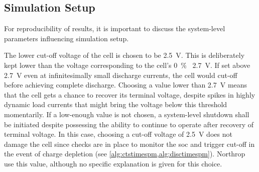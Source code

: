 \subsection{Simulation Setup}\label{subsec:basicspmsimsetup}

For  reproducibility of  results, it  is important  to discuss  the system-level
parameters influencing simulation setup.

The lower  cut-off voltage  of the  cell is chosen  to be  \SI{2.5}{\volt}. This
is  deliberately  kept  lower  than  the voltage  corresponding  to  the  cell's
\SI{0}{\percent} \ie~\SI{2.7}{\volt}.  If set  above  \SI{2.7}{\volt}  even
at  infinitesimally small  discharge  currents, the  cell  would cut-off  before
achieving complete discharge. Choosing a value lower than \SI{2.7}{V} means that
the cell gets a chance to recover its terminal voltage, despite spikes in highly
dynamic  load  currents  that  might  bring the  voltage  below  this  threshold
momentarily. If a low-enough value is  not chosen, a system-level shutdown shall
be  initiated  despite possessing  the  ability  to  continue to  operate  after
recovery  of terminal  voltage.  In this  case, choosing  a  cut-off voltage  of
\SI{2.5}{\volt} does  not damage the cell  since checks are in  place to monitor
the  \gls{soc}  and trigger  cut-off  in  the  event  of charge  depletion  (see
\cref{alg:ctstimespm,alg:disctimespm}).  Northrop~\etal~\cite{Northrop2011}  use
this value, although no specific explanation is given for this choice.


